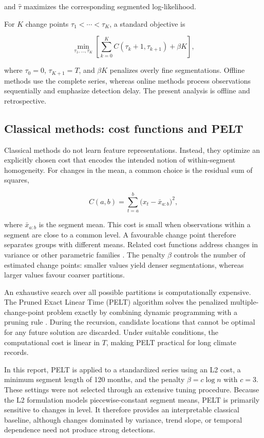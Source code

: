 \documentclass[
]{krantz}
\begin{document}
and \(\hat\tau\) maximizes the corresponding segmented log-likelihood.

For \(K\) change points \(\tau_1<\cdots<\tau_K\), a standard objective is

\[
\min_{\tau_1,\ldots,\tau_K}
\left[
\sum_{k=0}^{K}
C(\tau_k+1,\tau_{k+1})
+
\beta K
\right],
\]

where \(\tau_0=0\), \(\tau_{K+1}=T\), and \(\beta K\) penalizes overly fine segmentations. Offline methods use the complete series, whereas online methods process observations sequentially and emphasize detection delay. The present analysis is offline and retrospective.

\subsection{Classical methods: cost functions and PELT}\label{classical-methods-cost-functions-and-pelt}

Classical methods do not learn feature representations. Instead, they optimize an explicitly chosen cost that encodes the intended notion of within-segment homogeneity. For changes in the mean, a common choice is the residual sum of squares,

\[
C(a,b)
=
\sum_{t=a}^{b}
\bigl(x_t-\bar x_{a:b}\bigr)^2,
\]

where \(\bar x_{a:b}\) is the segment mean. This cost is small when observations within a segment are close to a common level. A favourable change point therefore separates groups with different means. Related cost functions address changes in variance or other parametric families \citep{truong2020}. The penalty \(\beta\) controls the number of estimated change points: smaller values yield denser segmentations, whereas larger values favour coarser partitions.

An exhaustive search over all possible partitions is computationally expensive. The Pruned Exact Linear Time (PELT) algorithm solves the penalized multiple-change-point problem exactly by combining dynamic programming with a pruning rule \citep{killick2012}. During the recursion, candidate locations that cannot be optimal for any future solution are discarded. Under suitable conditions, the computational cost is linear in \(T\), making PELT practical for long climate records.

In this report, PELT is applied to a standardized series using an L2 cost, a minimum segment length of 120 months, and the penalty \(\beta=c\log n\) with \(c=3\). These settings were not selected through an extensive tuning procedure. Because the L2 formulation models piecewise-constant segment means, PELT is primarily sensitive to changes in level. It therefore provides an interpretable classical baseline, although changes dominated by variance, trend slope, or temporal dependence need not produce strong detections.
\end{document}
